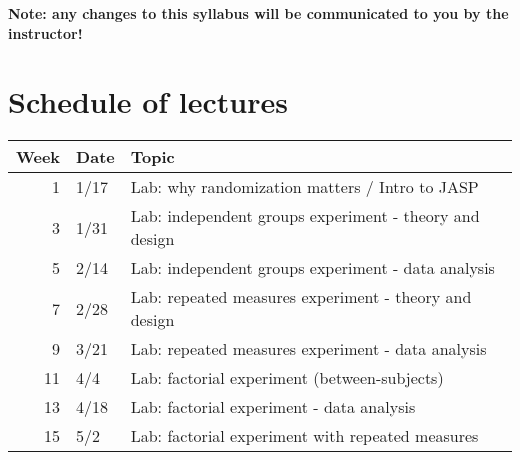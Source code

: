 \documentclass[10pt]{article}
\begin{document}
\textbf{\textbf{Note:  any changes to this syllabus will be communicated to you by the instructor!}}

\section*{Schedule of lectures}
\label{sec-11}
\begin{center}
\begin{tabular}{rll}
Week & Date & Topic\\
\hline
1 & 1/17 & Lab: why randomization matters / Intro to JASP\\
3 & 1/31 & Lab: independent groups experiment - theory and design\\
5 & 2/14 & Lab: independent groups experiment - data analysis\\
7 & 2/28 & Lab: repeated measures experiment - theory and design\\
9 & 3/21 & Lab: repeated measures experiment - data analysis\\
11 & 4/4 & Lab: factorial experiment (between-subjects)\\
13 & 4/18 & Lab: factorial experiment - data analysis\\
15 & 5/2 & Lab: factorial experiment with repeated measures\\
\end{tabular}
\end{center}
\end{document}
